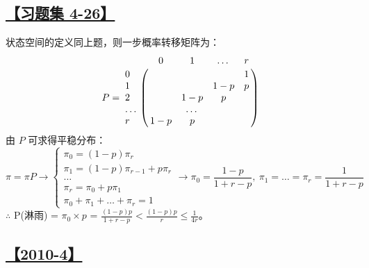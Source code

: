 \subsection{\hyperref[Q4-26]{【习题集 4-26】}}\label{A4-26}

状态空间的定义同上题，则一步概率转移矩阵为：
$$
P=\bordermatrix{
	~ & 0 & 1 & \dots & r \cr
	0 &   &   &   & 1 \cr
	1 &   &   & 1-p & p \cr
	2 &   & 1-p & p & \cr
	\dots &  & \dots & \cr
	r & 1-p & p \cr
}
$$
由 $P$ 可求得平稳分布：
$$
\pi=\pi P \rightarrow
\begin{cases}
\pi_0 = (1-p)\pi_r \\
\pi_1 = (1-p)\pi_{r-1} + p\pi_{r} \\
\dots \\
\pi_r = \pi_0 + p\pi_1 \\
\pi_0+\pi_1+\dots+\pi_r = 1
\end{cases}
\rightarrow \pi_0=\frac{1-p}{1+r-p},\ \pi_1=\dots=\pi_r=\frac{1}{1+r-p}
$$
$\therefore$ P(淋雨) = $\pi_0\times p$ = $\frac{(1-p)p}{1+r-p} < \frac{(1-p)p}{r} \le \frac{1}{4r}$。

\subsection{\hyperref[Q2010-4]{【2010-4】}}\label{A2010-4}

